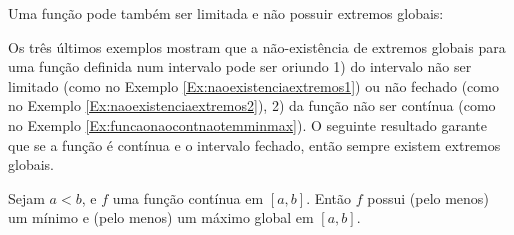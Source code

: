 \begin{ex}\label{Ex:funcaonaocontnaotemminmax}
Uma função pode também ser limitada e não possuir extremos globais:
\begin{center}
\begin{bmlimage}\end{bmlimage}
\end{center}
\end{ex}

Os três últimos exemplos mostram que a não-existência de extremos globais
para uma função definida num intervalo pode ser oriundo 1) do intervalo não ser
limitado (como no Exemplo \ref{Ex:naoexistenciaextremos1}) ou não fechado
(como no Exemplo \ref{Ex:naoexistenciaextremos2}), 2) da função não ser
contínua (como no Exemplo \ref{Ex:funcaonaocontnaotemminmax}).
O seguinte resultado garante que se a função é contínua e o intervalo fechado,
então sempre existem extremos globais.

\begin{teo}\label{Teo:funcaocontcompactpossuiextr}
Sejam  $a<b$, e $f$ uma função contínua em $[a,b]$. Então $f$ possui
(pelo menos) um mínimo e (pelo menos) um máximo global em $[a,b]$.
\end{teo} 

